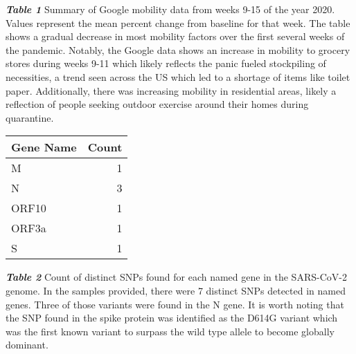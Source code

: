 \documentclass[
]{article}
\begin{document}
\textbf{\emph{Table 1}} Summary of Google mobility data from weeks 9-15
of the year 2020. Values represent the mean percent change from baseline
for that week. The table shows a gradual decrease in most mobility
factors over the first several weeks of the pandemic. Notably, the
Google data shows an increase in mobility to grocery stores during weeks
9-11 which likely reflects the panic fueled stockpiling of necessities,
a trend seen across the US which led to a shortage of items like toilet
paper. Additionally, there was increasing mobility in residential areas,
likely a reflection of people seeking outdoor exercise around their
homes during quarantine.

\begin{longtable}[]{@{}lr@{}}
\toprule
Gene Name & Count\tabularnewline
\midrule
\endhead
M & 1\tabularnewline
N & 3\tabularnewline
ORF10 & 1\tabularnewline
ORF3a & 1\tabularnewline
S & 1\tabularnewline
\bottomrule
\end{longtable}

\textbf{\emph{Table 2}} Count of distinct SNPs found for each named gene
in the SARS-CoV-2 genome. In the samples provided, there were 7 distinct
SNPs detected in named genes. Three of those variants were found in the
N gene. It is worth noting that the SNP found in the spike protein was
identified as the D614G variant which was the first known variant to
surpass the wild type allele to become globally dominant.
\end{document}
